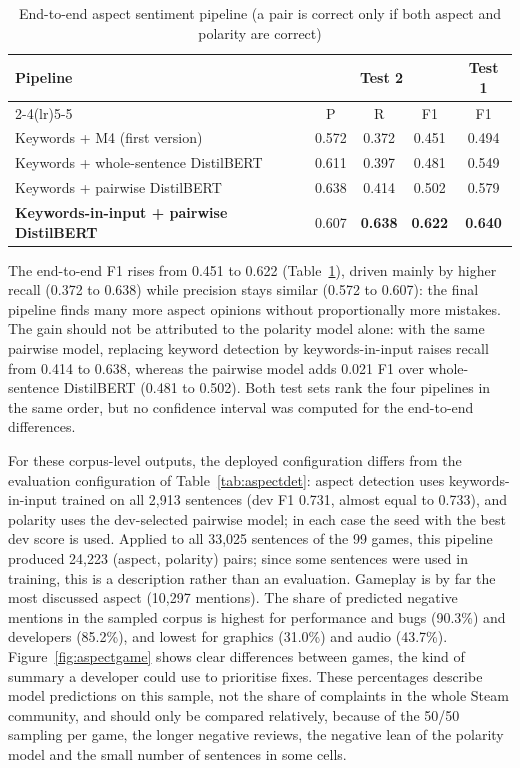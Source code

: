 \begin{table}[!htbp]
\centering
\caption{End-to-end aspect sentiment pipeline (a pair is correct only if both aspect and polarity are correct)}
\label{tab:pipeline}
\begin{tabular}{lcccc}
\toprule
\multirow{2}{*}{\textbf{Pipeline}} & \multicolumn{3}{c}{\textbf{Test 2}} & \textbf{Test 1} \\
\cmidrule(lr){2-4}\cmidrule(lr){5-5}
 & P & R & F1 & F1 \\
\midrule
Keywords + M4 (first version) & 0.572 & 0.372 & 0.451 & 0.494 \\
Keywords + whole-sentence DistilBERT & 0.611 & 0.397 & 0.481 & 0.549 \\
Keywords + pairwise DistilBERT & 0.638 & 0.414 & 0.502 & 0.579 \\
\textbf{Keywords-in-input + pairwise DistilBERT} & 0.607 & \textbf{0.638} & \textbf{0.622} & \textbf{0.640} \\
\bottomrule
\end{tabular}
\end{table}

The end-to-end F1 rises from 0.451 to 0.622 (Table~\ref{tab:pipeline}), driven mainly by higher recall (0.372 to 0.638) while precision stays similar (0.572 to 0.607): the final pipeline finds many more aspect opinions without proportionally more mistakes. The gain should not be attributed to the polarity model alone: with the same pairwise model, replacing keyword detection by keywords-in-input raises recall from 0.414 to 0.638, whereas the pairwise model adds 0.021 F1 over whole-sentence DistilBERT (0.481 to 0.502). Both test sets rank the four pipelines in the same order, but no confidence interval was computed for the end-to-end differences.

For these corpus-level outputs, the deployed configuration differs from the evaluation configuration of Table~\ref{tab:aspectdet}: aspect detection uses keywords-in-input trained on all 2,913 sentences (dev F1 0.731, almost equal to 0.733), and polarity uses the dev-selected pairwise model; in each case the seed with the best dev score is used. Applied to all 33,025 sentences of the 99 games, this pipeline produced 24,223 (aspect, polarity) pairs; since some sentences were used in training, this is a description rather than an evaluation. Gameplay is by far the most discussed aspect (10,297 mentions). The share of predicted negative mentions in the sampled corpus is highest for performance and bugs (90.3\%) and developers (85.2\%), and lowest for graphics (31.0\%) and audio (43.7\%). Figure~\ref{fig:aspectgame} shows clear differences between games, the kind of summary a developer could use to prioritise fixes. These percentages describe model predictions on this sample, not the share of complaints in the whole Steam community, and should only be compared relatively, because of the 50/50 sampling per game, the longer negative reviews, the negative lean of the polarity model and the small number of sentences in some cells.

